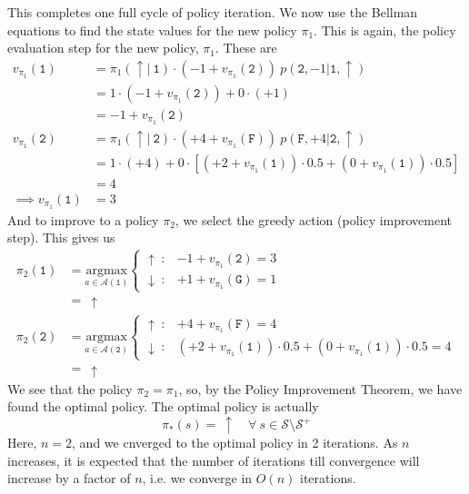\documentclass[11pt]{article}
\begin{document}
    This completes one full cycle of policy iteration. We now use the Bellman equations to find the state values for the new policy
    $\pi_{1}$. This is again, the policy evaluation step for the new policy, $\pi_{1}$. These are
    \begin{align*}
        v_{\pi_{1}}(\texttt{1}) &= \pi_{1}(\uparrow | \ \texttt{1}) \cdot ( -1 + v_{\pi_{1}}(\texttt{2}) ) \ p(\texttt{2}, -1 | \texttt{1}, \uparrow) \\
        &= 1 \cdot ( -1 + v_{\pi_{1}}(\texttt{2}) ) + 0 \cdot ( +1  ) \\
        &= -1 + v_{\pi_{1}}(\texttt{2}) \\
        v_{\pi_{1}}(\texttt{2}) &= \pi_{1}(\uparrow | \ \texttt{2}) \cdot ( +4 + v_{\pi_{1}}(\texttt{F}) ) \ p(\texttt{F}, +4 | \texttt{2}, \uparrow) \\
        &= 1 \cdot ( +4 ) + 0 \cdot [ ( +2 + v_{\pi_{1}}(\texttt{1}) ) \cdot 0.5 + ( 0 + v_{\pi_{1}}(\texttt{1}) ) \cdot 0.5 ] \\
        &= 4 \\
        \implies v_{\pi_{1}}(\texttt{1}) &= 3
    \end{align*}
    And to improve to a policy $\pi_{2}$, we select the greedy action (policy improvement step). This gives us
    \begin{align*}
        \pi_{2}(\texttt{1}) &= \underset{a \in \mathcal{A}(\texttt{1})}{\mathrm{argmax}} \begin{cases}
            \uparrow \ : & -1 + v_{\pi_{1}}(\texttt{2}) = 3 \\
            \downarrow \ : & +1 + v_{\pi_{1}}(\texttt{G}) = 1
        \end{cases} \\
        &= \ \uparrow \\
        \pi_{2}(\texttt{2}) &= \underset{a \in \mathcal{A}(\texttt{2})}{\mathrm{argmax}} \begin{cases}
            \uparrow \ : & +4 + v_{\pi_{1}}(\texttt{F}) = 4 \\
            \downarrow \ : & (+2 + v_{\pi_{1}}(\texttt{1})) \cdot 0.5 + (0 + v_{\pi_{1}}(\texttt{1})) \cdot 0.5 = 4
        \end{cases} \\
        &= \ \uparrow
    \end{align*}
    We see that the policy $\pi_{2} = \pi_{1}$, so, by the Policy Improvement Theorem, we have found the optimal policy.
    The optimal policy is actually
    $$\pi_{*}(s) = \ \uparrow \quad \forall \ s \in \mathcal{S} \setminus \mathcal{S}^{+}$$
    Here, $n = 2$, and we cnverged to the optimal policy in 2 iterations. As $n$ increases, it is expected that the number
    of iterations till convergence will increase by a factor of $n$, i.e. we converge in $O(n)$ iterations.
\end{document}
